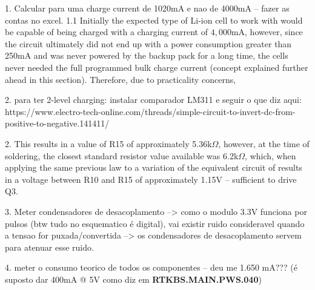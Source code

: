 
1. Calcular para uma charge current de 1020mA e nao de 4000mA -- fazer as contas no excel.
1.1 Initially the expected type of Li-ion cell to work with would be capable of being charged with a charging current of $4,000$mA, however, since the circuit ultimately did not end up with a power consumption greater than 250mA and was never powered by the backup pack for a long time, the cells never needed the full programmed bulk charge current (concept explained further ahead in this section). Therefore, due to practicality concerns,

2. para ter 2-level charging: instalar comparador LM311 e seguir o que diz aqui: https://www.electro-tech-online.com/threads/simple-circuit-to-invert-dc-from-positive-to-negative.141411/

2. This results in a value of R15 of approximately 5.36k$\Omega$, however, at the time of soldering, the closest standard resistor value available was 6.2k$\Omega$, which, when applying the same previous law to a variation of the equivalent circuit of
results in a voltage between R10 and R15 of approximately 1.15V -- sufficient to drive Q3.

3. Meter condensadores de desacoplamento --> como o modulo 3.3V funciona por pulsos (btw tudo no esquematico é digital), vai existir ruido consideravel quando a tensao for puxada/convertida --> os condensadores de desacoplamento servem para atenuar esse ruido.

4. meter o consumo teorico de todos os componentes -- deu me 1.650 mA??? (é suposto dar 400mA @ 5V como diz em \textbf{RTKBS.MAIN.PWS.040})

